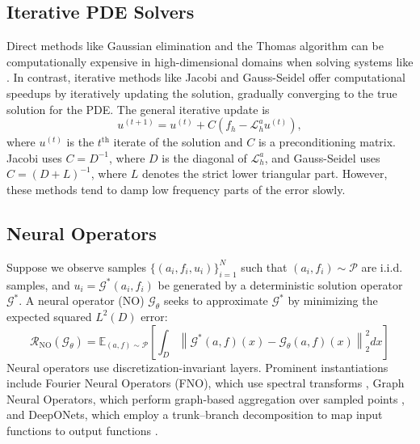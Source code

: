 \documentclass{article}
\begin{document}
\subsection{Iterative PDE Solvers} \label{sec:finitedifference}
Direct methods like Gaussian elimination and the Thomas algorithm can be computationally expensive in high-dimensional domains when solving systems like . In contrast, iterative methods like Jacobi and Gauss-Seidel offer computational speedups by iteratively updating the solution, gradually converging to the true solution for the PDE. The general iterative update is
\begin{equation}\label{eq:iterativeupdate}
    u^{(t + 1)} = u^{(t)} + C\left(f_h - \mathcal{L}_h^au^{(t)}\right),
\end{equation}
where $u^{(t)}$ is the $t^{\text{th}}$ iterate of the solution and $C$ is a preconditioning matrix. Jacobi uses $C = D^{-1}$, where $D$ is the diagonal of $\mathcal{L}_h^a$, and Gauss-Seidel uses $C = (D + L)^{-1}$, where $L$ denotes the strict lower triangular part. 
However, these methods tend to damp low frequency parts of the error slowly. 






\subsection{Neural Operators} \label{sec:neuraloperators}

Suppose we observe samples $\{(a_i, f_i, u_i)\}_{i = 1}^N$ such that $(a_i, f_i) \sim \mathcal{P}$ are i.i.d. samples, and $u_i = \mathcal{G}^{*}(a_i, f_i)$ be generated by a deterministic solution operator $\mathcal{G}^{*}$. 
A neural operator (NO) $\mathcal{G}_{\theta}$ seeks to approximate $\mathcal{G}^*$ by minimizing the expected squared $L^2(D)$ error:
\begin{equation*} 
    \mathcal{R}_{\text{NO}}(\mathcal{G}_{\theta})  = \mathbb{E}_{(a, f) \sim  \mathcal{P}}\left[ \int_{D} \left\|\mathcal{G}^{*}(a, f)(x) - \mathcal{G}_{\theta}(a, f)(x)\right\|_2^2dx\right]
\end{equation*}
Neural operators use discretization-invariant layers. Prominent instantiations include Fourier Neural Operators (FNO), which use spectral transforms \citep{li2020fourier}, Graph Neural Operators, which perform graph-based aggregation over sampled points \citep{li2020multipole}, and DeepONets, which employ a trunk–branch decomposition to map input functions to output functions \citep{lu2021learning}. 
\end{document}
